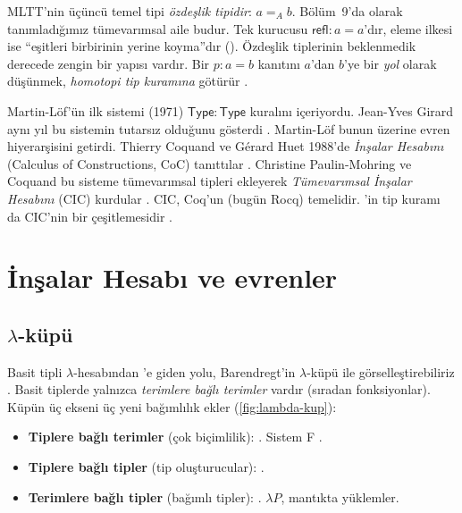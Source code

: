 \noindent MLTT'nin üçüncü temel tipi \emph{özdeşlik tipidir}: $a =_A b$.
Bölüm~9'da  olarak tanımladığımız tümevarımsal aile budur. Tek
kurucusu $\mathsf{refl} : a = a$'dır, eleme ilkesi ise ``eşitleri
birbirinin yerine koyma''dır (). Özdeşlik tiplerinin beklenmedik
derecede zengin bir yapısı vardır. Bir $p : a = b$ kanıtını $a$'dan $b$'ye
bir \emph{yol} olarak düşünmek, \emph{homotopi tip kuramına} götürür
\citep{hott2013}.

\begin{tarihce}
Martin-Löf'ün ilk sistemi (1971) $\mathsf{Type} : \mathsf{Type}$ kuralını
içeriyordu. Jean-Yves Girard aynı yıl bu sistemin tutarsız olduğunu
gösterdi \citep{girard1972}. Martin-Löf bunun üzerine evren hiyerarşisini
getirdi. Thierry Coquand ve Gérard Huet 1988'de \emph{İnşalar Hesabını}
(Calculus of Constructions, CoC) tanıttılar \citep{coquand1988}. Christine
Paulin-Mohring ve Coquand bu sisteme tümevarımsal tipleri ekleyerek
\emph{Tümevarımsal İnşalar Hesabını} (CIC) kurdular \citep{paulin1993}.
CIC, Coq'un (bugün Rocq) temelidir. \Lean{}'in tip kuramı da CIC'nin bir
çeşitlemesidir \citep{demoura2021lean4,carneiro2019}.
\end{tarihce}

\section{İnşalar Hesabı ve evrenler}\label{sec:evrenler}

\subsection{$\lambda$-küpü}

Basit tipli $\lambda$-hesabından \Lean{}'e giden yolu, Barendregt'in
$\lambda$-küpü ile görselleştirebiliriz \citep{barendregt1991}. Basit
tiplerde yalnızca \emph{terimlere bağlı terimler} vardır (sıradan
fonksiyonlar). Küpün üç ekseni üç yeni bağımlılık ekler
(\cref{fig:lambda-kup}):

\begin{itemize}
  \item \textbf{Tiplere bağlı terimler} (çok biçimlilik): . Sistem F \citep{girard1989}.
  \item \textbf{Tiplere bağlı tipler} (tip oluşturucular): .
  \item \textbf{Terimlere bağlı tipler} (bağımlı tipler): . $\lambda P$, mantıkta yüklemler.
\end{itemize}

